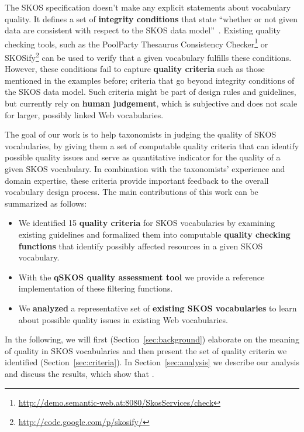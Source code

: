 
The SKOS specification doesn't make any explicit statements about vocabulary quality. It defines a set of \textbf{integrity conditions} that state ``whether or not given data are consistent with respect to the SKOS data model''~\cite{Miles2005}. Existing quality checking tools, such as the PoolParty Thesaurus Consistency Checker\footnote{\url{http://demo.semantic-web.at:8080/SkosServices/check}} or SKOSify\footnote{\url{http://code.google.com/p/skosify/}} can be used to verify that a given vocabulary fulfills these conditions. However, these conditions fail to capture \textbf{quality criteria} such as those mentioned in the examples before; criteria that go beyond integrity conditions of the SKOS data model. Such criteria might be part of design rules and guidelines, but currently rely on \textbf{human judgement}, which is subjective and does not scale for larger, possibly linked Web vocabularies.


The goal of our work is to help taxonomists in judging the quality of SKOS vocabularies, by giving them a set of computable quality criteria that can identify possible quality issues and serve as quantitative indicator for the quality of a given SKOS vocabulary. In combination with the taxonomists' experience and domain expertise, these criteria provide important feedback to the overall vocabulary design process. The main contributions of this work can be summarized as follows:

\begin{itemize}

	\item We identified 15 \textbf{quality criteria} for SKOS vocabularies by examining existing guidelines and formalized them into computable \textbf{quality checking functions} that identify possibly affected resources in a given SKOS vocabulary.
	
	\item With the \textbf{qSKOS quality assessment tool} we provide a reference implementation of these filtering functions.

	\item We \textbf{analyzed} a representative set of \textbf{existing SKOS vocabularies} to learn about possible quality issues in existing Web vocabularies.

\end{itemize}

In the following, we will first (Section~\ref{sec:background}) elaborate on the meaning of quality in SKOS vocabularies and then present the set of quality criteria we identified (Section~\ref{sec:criteria}). In Section~\ref{sec:analysis} we describe our analysis and discuss the results, which show that .
